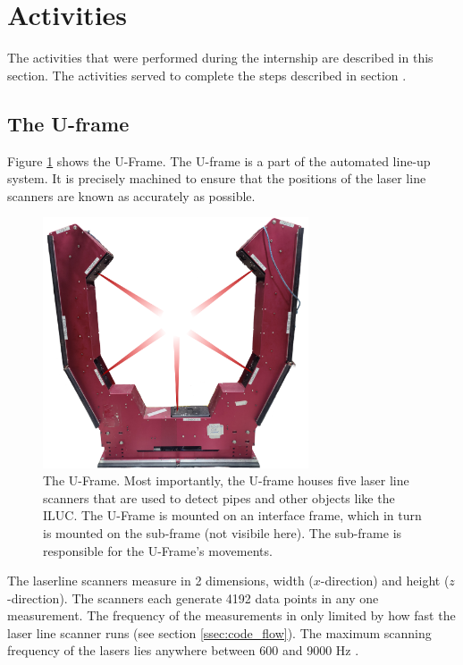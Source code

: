 \section{Activities} \label{sec:activities}
The activities that were performed during the internship are described in this section. The activities served to complete the steps described in section .

\subsection{The U-frame} \label{ssec:U-frame}
Figure \ref{fig:U-frame} shows the U-Frame. The U-frame is a part of the automated line-up system. It is precisely machined to ensure that the positions of the laser line scanners are known as accurately as possible.
\begin{figure}[H]
    \centering
    \includegraphics[width=0.7\textwidth]{images/u_frame_lasers.png}
    \caption{The U-Frame. Most importantly, the U-frame houses five laser line scanners that are used to detect pipes and other objects like the ILUC. The U-Frame is mounted on an interface frame, which in turn is mounted on the sub-frame (not visibile here). The sub-frame is responsible for the U-Frame's movements.}
    \label{fig:U-frame}
\end{figure}
The laserline scanners measure in 2 dimensions, width ($x$-direction) and height ($z$-direction). The scanners each generate 4192 data points in any one measurement. The frequency of the measurements in only limited by how fast the laser line scanner runs (see section \ref{ssec:code_flow}). The maximum scanning frequency of the lasers lies anywhere between 600 and 9000 Hz \cite{gocator2650datasheet}.

